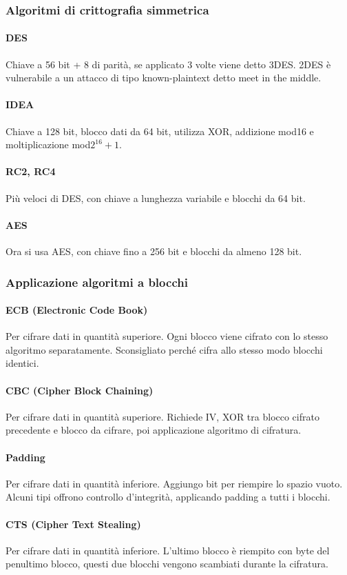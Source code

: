 \documentclass[11pt]{article}
\begin{document}
\subsubsection{Algoritmi di crittografia simmetrica}
\paragraph*{DES}
Chiave a 56 bit + 8 di parità, se applicato 3 volte viene detto 3DES. 2DES è vulnerabile a un attacco di tipo known-plaintext
detto meet in the middle.
\paragraph*{IDEA}
Chiave a 128 bit, blocco dati da 64 bit, utilizza XOR, addizione mod16 e moltiplicazione mod$2^{16}+1$.
\paragraph*{RC2, RC4}
Più veloci di DES, con chiave a lunghezza variabile e blocchi da 64 bit.
\paragraph*{AES}
Ora si usa AES, con chiave fino a 256 bit e blocchi da almeno 128 bit.
\subsubsection{Applicazione algoritmi a blocchi}
\paragraph*{ECB (Electronic Code Book)}
Per cifrare dati in quantità superiore. Ogni blocco viene cifrato con lo stesso algoritmo separatamente. Sconsigliato 
perché cifra allo stesso modo blocchi identici.
\paragraph*{CBC (Cipher Block Chaining)}
Per cifrare dati in quantità superiore. Richiede IV, XOR tra blocco cifrato precedente e blocco da cifrare, poi applicazione 
algoritmo di cifratura.
\paragraph*{Padding}
Per cifrare dati in quantità inferiore. Aggiungo bit per riempire lo spazio vuoto. Alcuni tipi offrono controllo d'integrità,
applicando padding a tutti i blocchi.
\paragraph*{CTS (Cipher Text Stealing)}
Per cifrare dati in quantità inferiore. L'ultimo blocco è riempito con byte del penultimo blocco, questi due blocchi 
vengono scambiati durante la cifratura.
\end{document}

